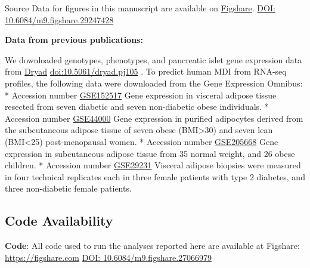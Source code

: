 \documentclass[
]{article}
\begin{document}
Source Data for figures in this manuscript are available on
\href{https://figshare.com/}{Figshare}.
\href{https://figshare.com/account/projects/251795/articles/29247428?file=55154321}{DOI:
10.6084/m9.figshare.29247428} \cite{tyler_2025}

\textbf{Data from previous publications:}

We downloaded genotypes, phenotypes, and pancreatic islet gene
expression data from \href{https://datadryad.org/}{Dryad}
\href{https://datadryad.org/dataset/doi:10.5061/dryad.pj105}{doi:10.5061/dryad.pj105}
\cite{DO_data}. To predict human MDI from RNA-seq profiles, the
following data were downloaded from the Gene Expression Omnibus: *
Accession number
\href{https://www.ncbi.nlm.nih.gov/geo/query/acc.cgi?acc=GSE152517}{GSE152517}
Gene expression in visceral adipose tissue resected from seven diabetic
and seven non-diabetic obese individuals. * Accession number
\href{https://www.ncbi.nlm.nih.gov/geo/query/acc.cgi?acc=GSE44000}{GSE44000}
Gene expression in purified adipocytes derived from the subcutaneous
adipose tissue of seven obese (BMI\textgreater30) and seven lean
(BMI\textless25) post-menopausal women. * Accession number
\href{https://www.ncbi.nlm.nih.gov/geo/query/acc.cgi?acc=GSE205668}{GSE205668}
Gene expression in subcutaneous adipose tissue from 35 normal weight,
and 26 obese children. * Accession number
\href{https://www.ncbi.nlm.nih.gov/geo/query/acc.cgi?acc=GSE29231}{GSE29231}
Visceral adipose biopsies were measured in four technical replicates
each in three female patients with type 2 diabetes, and three
non-diabetic female patients.

\subsection{Code Availability}\label{code-availability}

\textbf{Code}: All code used to run the analyses reported here are
available at Figshare: \url{https://figshare.com}
\href{https://figshare.com/articles/dataset/Data_and_code_for_High-Dimensional_Mediation_Analysis_HDMA_in_diversity_outbred_mice/27066979}{DOI:
10.6084/m9.figshare.27066979} \cite{cube_data}

\pagebreak
\end{document}
